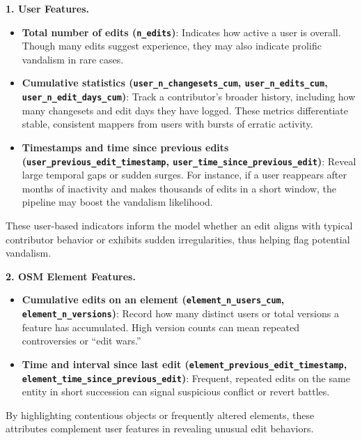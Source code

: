 \documentclass[
    13pt, %
    a4paper, %
    listof=totoc, %
    bibliography=totoc, %
    index=totoc, %
    headsepline
]{scrreprt}
\begin{document}
\vspace{1em}
\noindent
\textbf{1. User Features.}
\begin{itemize}
  \item \textbf{Total number of edits (\texttt{n\_edits})}: Indicates how active a user is overall. Though many edits suggest experience, they may also indicate prolific vandalism in rare cases.
  \item \textbf{Cumulative statistics (\texttt{user\_n\_changesets\_cum}, \texttt{user\_n\_edits\_cum}, \newline \texttt{user\_n\_edit\_days\_cum})}: Track a contributor’s broader history, including how many changesets and edit days they have logged. These metrics differentiate stable, consistent mappers from users with bursts of erratic activity.
  \item \textbf{Timestamps and time since previous edits (\texttt{user\_previous\_edit\_timestamp}, \texttt{user\_time\_since\_previous\_edit})}: Reveal large temporal gaps or sudden surges. For instance, if a user reappears after months of inactivity and makes thousands of edits in a short window, the pipeline may boost the vandalism likelihood.
\end{itemize}
These user-based indicators inform the model whether an edit aligns with typical contributor behavior or exhibits sudden irregularities, thus helping flag potential vandalism.

\vspace{1em}
\noindent
\textbf{2. OSM Element Features.}
\begin{itemize}
  \item \textbf{Cumulative edits on an element (\texttt{element\_n\_users\_cum}, \newline \texttt{element\_n\_versions})}: Record how many distinct users or total versions a feature has accumulated. High version counts can mean repeated controversies or “edit wars.”
  \item \textbf{Time and interval since last edit (\texttt{element\_previous\_edit\_timestamp}, \newline \texttt{element\_time\_since\_previous\_edit})}: Frequent, repeated edits on the same entity in short succession can signal suspicious conflict or revert battles.
\end{itemize}
By highlighting contentious objects or frequently altered elements, these attributes complement user features in revealing unusual edit behaviors.
\end{document}
